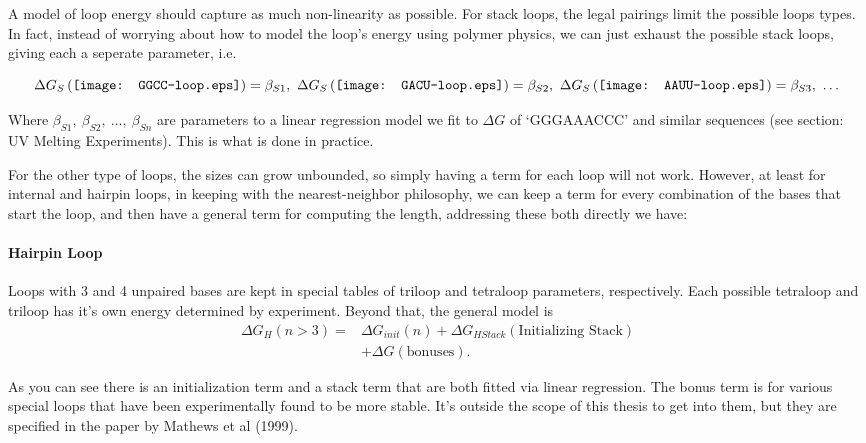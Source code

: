 A model of loop energy should capture as much non-linearity as
possible. For stack loops, the legal pairings limit the possible loops
types. In fact, instead of worrying about how to model the loop's
energy using polymer physics, we can just exhaust the possible stack
loops, giving each a seperate parameter, i.e.

\begin{equation}
\Delta G_S \left ( \vcenter{\hbox{\texttt{[image: GGCC-loop.eps]}}}
\right ) = \beta_{S1}, \  
\Delta G_S \left ( \vcenter{\hbox{\texttt{[image: GACU-loop.eps]}}}
\right ) = \beta_{S2}, \ 
\Delta G_S \left ( \vcenter{\hbox{\texttt{[image: AAUU-loop.eps]}}}
\right ) = \beta_{S3}, \ \dots
\end{equation}

Where $\beta_{S1},\  \beta_{S2},\  \dots,\  \beta_{Sn}$ are parameters to a linear
regression model we fit to $\Delta G$ of `GGGAAACCC' and similar
sequences (see section: UV Melting Experiments). This is what is done in practice.

For the other type of loops, the sizes can grow unbounded, so simply
having a term for each loop will not work. However, at least for
internal and hairpin loops, in keeping with the nearest-neighbor
philosophy, we can keep a term for every combination of the bases that
start the loop, and then have a general term for computing the length,
addressing these both directly we have:

\paragraph{Hairpin Loop} 
Loops with 3 and 4 unpaired bases are kept in special tables of
triloop and tetraloop parameters, respectively. Each possible
tetraloop and triloop has it's own energy determined by
experiment. Beyond that, the general model is 
\begin{align}
\Delta G_H(n > 3) = & \Delta G_{init}(n) + \Delta
G_{HStack} (\text{Initializing Stack}) \\
&+ \Delta G (\text{bonuses}).
\end{align}

As you can see there is an initialization term and a stack term that
are both fitted via linear regression. The bonus term is for various
special loops that have been experimentally found to be more
stable. It's outside the scope of this thesis to get into them, but
they are specified in the paper by Mathews et al (1999).

